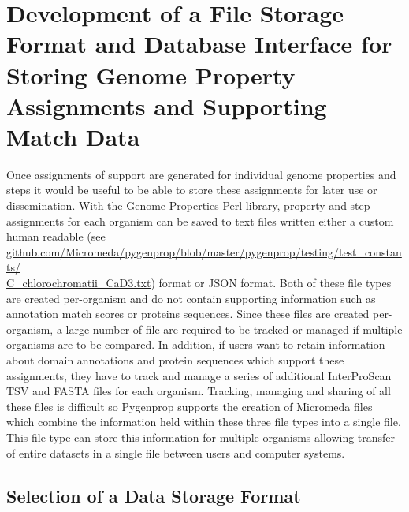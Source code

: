 \section{Development of a File Storage Format and Database Interface for Storing Genome Property Assignments and Supporting Match Data}

Once assignments of support are generated for individual genome properties and steps it would be useful to be able to store these assignments for later use or dissemination. With the Genome Properties Perl library, property and step assignments for each organism can be saved to text files written either a custom human readable (see \\ \href{github.com/Micromeda/pygenprop/blob/master/pygenprop/testing/test\_constants/C\_chlorochromatii\_CaD3.txt}{github.com/Micromeda/pygenprop/blob/master/pygenprop/testing/test\_constants/ \\ C\_chlorochromatii\_CaD3.txt}) format or JSON format. Both of these file types are created per-organism and do not contain supporting information such as annotation match scores or proteins sequences. Since these files are created per-organism, a large number of file are required to be tracked or managed if multiple organisms are to be compared. In addition, if users want to retain information about domain annotations and protein sequences which support these assignments, they have to track and manage a series of additional InterProScan TSV and FASTA files for each organism. Tracking, managing and sharing of all these files is  difficult so Pygenprop supports the creation of Micromeda files which combine the information held within these three file types into a single file. This file type can store this information for multiple organisms allowing transfer of entire datasets in a single file between users and computer systems.

\subsection{Selection of a Data Storage Format}

